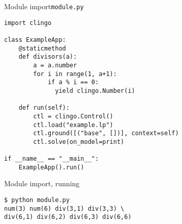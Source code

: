 \begin{frame}{Module import}{\texttt{module.py}}
\begin{lstlisting}
import clingo

class ExampleApp:
    @staticmethod
    def divisors(a):
        a = a.number
        for i in range(1, a+1):
            if a % i == 0:
              yield clingo.Number(i)

    def run(self):
        ctl = clingo.Control()
        ctl.load("example.lp")
        ctl.ground([("base", [])], context=self)
        ctl.solve(on_model=print)

if __name__ == "__main__":
    ExampleApp().run()
\end{lstlisting}
\end{frame}
\begin{frame}[fragile]{Module import, running}
  \bigskip
\begin{lstlisting}
$ python module.py
num(3) num(6) div(3,1) div(3,3) \
div(6,1) div(6,2) div(6,3) div(6,6)
\end{lstlisting}
\end{frame}
%
